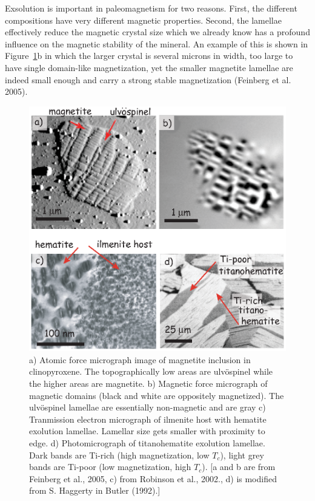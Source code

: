 Exsolution is important in paleomagnetism for two reasons.  First, the different compositions have very different magnetic properties.  Second,  the lamellae effectively reduce the magnetic crystal size which we already know has a profound influence on the magnetic stability of the mineral.   An example of this is shown in Figure~\ref{fig:exsolution}b in which the larger crystal is  several microns in width, too large to have single domain-like magnetization, yet the smaller magnetite lamellae are indeed small enough and carry a strong stable magnetization 
 (Feinberg et al. 2005). \nocite{feinberg05}


\begin{figure}[htb]
\centering  \includegraphics[width=12 cm]{EPSfiles/exsolution.eps}
\caption{a) Atomic force micrograph image of magnetite inclusion in clinopyroxene.  The topographically low areas are ulv\"ospinel while the higher areas are magnetite.  b) Magnetic force micrograph of magnetic domains (black and white are oppositely magnetized).  The ulv\"ospinel lamellae are essentially non-magnetic and are gray    c) Tranmission electron micrograph of ilmenite host with hematite exolution lamellae.  Lamellar size gets smaller  with proximity to edge.   d) Photomicrograph of  titanohematite exolution lamellae. Dark bands are Ti-rich (high  magnetization, low $T_c$), light grey bands are Ti-poor (low magnetization, high $T_c$).  [a and b are from Feinberg et al., 2005, c) from Robinson et al., 2002., d) is modified from S. Haggerty in Butler (1992).]}
\label{fig:exsolution}
\end{figure}
\nocite{feinberg05,robinson02,butler92}

